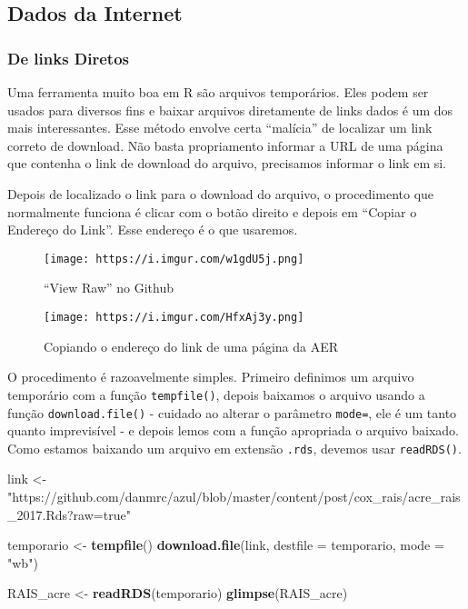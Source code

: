 \documentclass[
]{article}
\newenvironment{Shaded}{\begin{snugshade}}{\end{snugshade}}
\newcommand{\DataTypeTok}[1]{\textcolor[rgb]{0.13,0.29,0.53}{#1}}
\newcommand{\KeywordTok}[1]{\textcolor[rgb]{0.13,0.29,0.53}{\textbf{#1}}}
\newcommand{\NormalTok}[1]{#1}
\newcommand{\StringTok}[1]{\textcolor[rgb]{0.31,0.60,0.02}{#1}}
\begin{document}
\hypertarget{dados-da-internet}{%
\subsection{Dados da Internet}\label{dados-da-internet}}

\hypertarget{de-links-diretos}{%
\subsubsection{De links Diretos}\label{de-links-diretos}}

Uma ferramenta muito boa em R são arquivos temporários. Eles podem ser
usados para diversos fins e baixar arquivos diretamente de links dados é
um dos mais interessantes. Esse método envolve certa ``malícia'' de
localizar um link correto de download. Não basta propriamento informar a
URL de uma página que contenha o link de download do arquivo, precisamos
informar o link em si.

Depois de localizado o link para o download do arquivo, o procedimento
que normalmente funciona é clicar com o botão direito e depois em
``Copiar o Endereço do Link''. Esse endereço é o que usaremos.

\begin{figure}
\centering
\texttt{[image: https://i.imgur.com/w1gdU5j.png]}
\caption{``View Raw'' no Github}
\end{figure}

\begin{figure}
\centering
\texttt{[image: https://i.imgur.com/HfxAj3y.png]}
\caption{Copiando o endereço do link de uma página da AER}
\end{figure}

O procedimento é razoavelmente simples. Primeiro definimos um arquivo
temporário com a função \texttt{tempfile()}, depois baixamos o arquivo
usando a função \texttt{download.file()} - cuidado ao alterar o
parâmetro \texttt{mode=}, ele é um tanto quanto imprevisível - e depois
lemos com a função apropriada o arquivo baixado. Como estamos baixando
um arquivo em extensão \texttt{.rds}, devemos usar \texttt{readRDS()}.

\begin{Shaded}
\begin{Highlighting}[]
\NormalTok{link <-}\StringTok{ "https://github.com/danmrc/azul/blob/master/content/post/cox_rais/acre_rais_2017.Rds?raw=true"}

\NormalTok{temporario <-}\StringTok{ }\KeywordTok{tempfile}\NormalTok{()}
\KeywordTok{download.file}\NormalTok{(link, }\DataTypeTok{destfile =}\NormalTok{ temporario, }\DataTypeTok{mode =} \StringTok{"wb"}\NormalTok{)}

\NormalTok{RAIS_acre <-}\StringTok{ }\KeywordTok{readRDS}\NormalTok{(temporario)}
\KeywordTok{glimpse}\NormalTok{(RAIS_acre)}
\end{Highlighting}
\end{Shaded}
\end{document}
